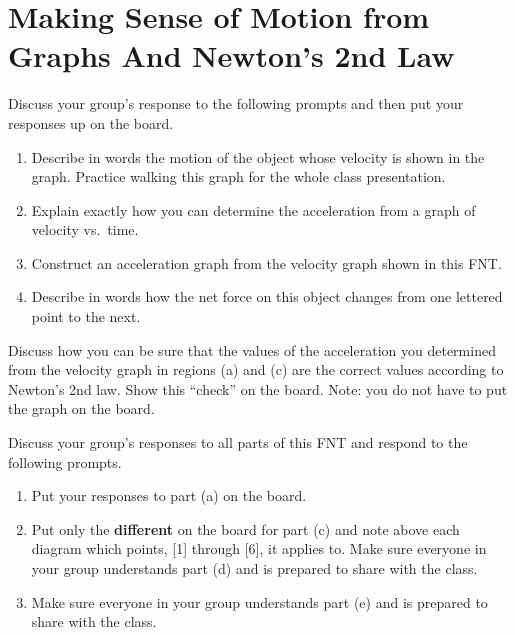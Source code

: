 \section[Graphs of Motion and Newton's 2nd Law]{Making Sense of Motion from Graphs And Newton's 2nd Law}
\label{act8.2.3}

\begin{fnt}
	
\end{fnt}

Discuss your group's response to the following prompts and then put your responses up on the board.
\begin{enumerate}
	\item Describe in words the motion of the object whose velocity is shown in the graph. Practice walking this graph for the whole class presentation.
	\item Explain exactly how you can determine the acceleration from a graph of velocity vs.\ time.
	\item Construct an acceleration graph from the velocity graph shown in this FNT.
	\item Describe in words how the net force on this object changes from one lettered point to the next.
\end{enumerate}

\WCD

\begin{fnt}
	
\end{fnt}

Discuss how you can be sure that the values of the acceleration you determined from the velocity graph in regions (a) and (c) are the correct values according to Newton's 2nd law. Show this ``check'' on the board. Note: you do not have to put the graph on the board.

\WCD

\begin{fnt}
	
\end{fnt}

Discuss your group's responses to all parts of this FNT and respond to the following prompts.
\begin{enumerate}
	\item Put your responses to part (a) on the board.
	\item Put only the \textbf{different} \forcediags{} on the board for part (c) and note above each diagram which points, [1] through [6], it applies to. Make sure everyone in your group understands part (d) and is prepared to share with the class.
	\item Make sure everyone in your group understands part (e) and is prepared to share with the class.
\end{enumerate}

